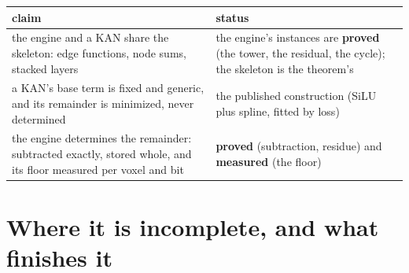 {\small
\setlength{\tabcolsep}{6pt}
\begin{longtable}{>{\RaggedRight\arraybackslash}p{}>{\RaggedRight\arraybackslash}p{}}
\toprule
claim & status \\
\midrule
\endhead
the engine and a KAN share the skeleton: edge functions, node sums, stacked layers & the engine's instances are \textbf{proved} (the tower, the residual, the cycle); the skeleton is the theorem's \\
a KAN's base term is fixed and generic, and its remainder is minimized, never determined & the published construction (SiLU plus spline, fitted by loss) \\
the engine determines the remainder: subtracted exactly, stored whole, and its floor measured per voxel and bit & \textbf{proved} (subtraction, residue) and \textbf{measured} (the floor) \\
\bottomrule
\end{longtable}
}

\section{\texorpdfstring{Where it is incomplete, and what finishes it}{Where it is incomplete, and what finishes it}}


